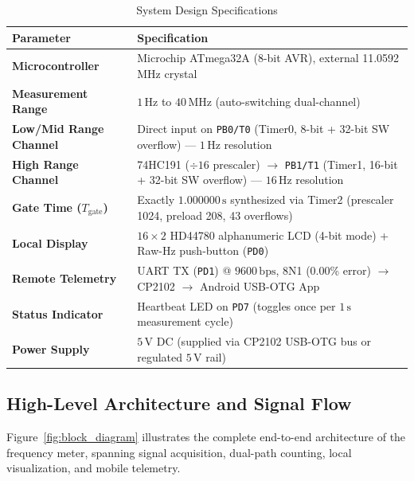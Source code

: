 \documentclass[11pt,a4paper]{article}
\begin{document}
\begin{table}[H]
\centering
\caption{System Design Specifications}
\label{tab:specs}
\renewcommand{\arraystretch}{1.2}
\begin{tabularx}{\textwidth}{>{\bfseries}l X}
\toprule
Parameter & Specification \\
\midrule
Microcontroller & Microchip ATmega32A (8-bit AVR), external 11.0592\,MHz crystal \\
Measurement Range & $1\,\text{Hz}$ to $40\,\text{MHz}$ (auto-switching dual-channel) \\
Low/Mid Range Channel & Direct input on \texttt{PB0/T0} (Timer0, 8-bit + 32-bit SW overflow) --- $1\,\text{Hz}$ resolution \\
High Range Channel & 74HC191 ($\div 16$ prescaler) $\rightarrow$ \texttt{PB1/T1} (Timer1, 16-bit + 32-bit SW overflow) --- $16\,\text{Hz}$ resolution \\
Gate Time ($T_{\text{gate}}$) & Exactly $1.000000\,\text{s}$ synthesized via Timer2 (prescaler 1024, preload 208, 43 overflows) \\
Local Display & $16\times 2$ HD44780 alphanumeric LCD (4-bit mode) + Raw-Hz push-button (\texttt{PD0}) \\
Remote Telemetry & UART TX (\texttt{PD1}) @ $9600\,\text{bps}$, 8N1 (0.00\% error) $\rightarrow$ CP2102 $\rightarrow$ Android USB-OTG App \\
Status Indicator & Heartbeat LED on \texttt{PD7} (toggles once per $1\,\text{s}$ measurement cycle) \\
Power Supply & $5\,\text{V}$ DC (supplied via CP2102 USB-OTG bus or regulated $5\,\text{V}$ rail) \\
\bottomrule
\end{tabularx}
\end{table}

\subsection{High-Level Architecture and Signal Flow}
Figure~\ref{fig:block_diagram} illustrates the complete end-to-end architecture of the frequency meter, spanning signal acquisition, dual-path counting, local visualization, and mobile telemetry.
\end{document}
